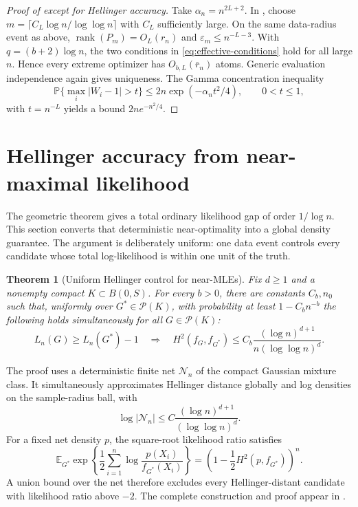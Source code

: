 \documentclass[11pt]{article}
\newtheorem{theorem}{Theorem}[section]
\theoremstyle{definition}
\theoremstyle{remark}
\DeclareMathOperator{\rank}{rank}
\newcommand{\Pcal}{\mathcal P}
\newcommand{\Ncal}{\mathcal N}
\newcommand{\EE}{\mathbb E}
\newcommand{\PP}{\mathbb P}
\newcommand{\abs}[1]{\lvert #1\rvert}
\newcommand{\eps}{\varepsilon}
\begin{document}
\begin{proof}[Proof of  except for Hellinger accuracy]
Take $\alpha_n=n^{2L+2}$.  In , choose
$m=\lceil C_L\log n/\log\log n\rceil$ with $C_L$ sufficiently large.  On
the same data-radius event as above,
$\rank(P_m)=O_L(r_n)$ and $\eps_m\le n^{-L-3}$.  With
$q=(b+2)\log n$, the two conditions in \eqref{eq:effective-conditions} hold
for all large $n$.  Hence every extreme optimizer has
$O_{b,L}(\bar r_n)$ atoms.  Generic evaluation independence again gives
uniqueness.  The Gamma concentration inequality
\[
 \PP\{\max_i\abs{W_i-1}>t\}\le2n\exp(-\alpha_nt^2/4),
 \qquad 0<t\le1,
\]
with $t=n^{-L}$ yields a bound $2ne^{-n^2/4}$.
\end{proof}

\section{Hellinger accuracy from near-maximal likelihood}
\label{sec:hellinger}

The geometric theorem gives a total ordinary likelihood gap of order
$1/\log n$.  This section converts that deterministic near-optimality into a
global density guarantee.  The argument is deliberately uniform: one data
event controls every candidate whose total log-likelihood is within one unit
of the truth.

\begin{theorem}[Uniform Hellinger control for near-MLEs]
\label{thm:near-mle}
Fix $d\ge1$ and a nonempty compact $K\subset B(0,S)$.  For every $b>0$,
there are constants $C_b,n_0$ such that, uniformly over
$G^*\in\Pcal(K)$, with probability at least $1-C_bn^{-b}$ the following
holds simultaneously for all $G\in\Pcal(K)$:
\begin{equation}\label{eq:near-truth}
 L_n(G)\ge L_n(G^*)-1
 \quad\Longrightarrow\quad
 H^2(f_G,f_{G^*})
 \le C_b\frac{(\log n)^{d+1}}
 {n(\log\log n)^d}.
\end{equation}
\end{theorem}

The proof uses a deterministic finite net $\Ncal_n$ of the compact Gaussian
mixture class.  It simultaneously approximates Hellinger distance globally
and log densities on the sample-radius ball, with
\begin{equation}\label{eq:net-entropy-summary}
 \log\abs{\Ncal_n}
 \le C\frac{(\log n)^{d+1}}{(\log\log n)^d}.
\end{equation}
For a fixed net density $p$, the square-root likelihood ratio satisfies
\[
 \EE_{G^*}\exp\left\{\frac12\sum_{i=1}^n
          \log\frac{p(X_i)}{f_{G^*}(X_i)}\right\}
 =\left(1-\frac12H^2(p,f_{G^*})\right)^n.
\]
A union bound over the net therefore excludes every Hellinger-distant
candidate with likelihood ratio above $-2$.  The complete construction and
proof appear in .
\end{document}
